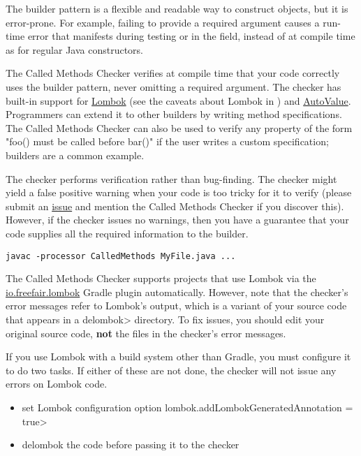 \htmlhr
{}

The builder pattern is a flexible and readable way to construct objects, but it is error-prone.
For example, failing to provide a required argument causes a run-time error that manifests during testing
or in the field, instead of at compile time as for regular Java constructors.

The Called Methods Checker verifies at compile time that your code correctly uses the builder pattern,
never omitting a required argument. The checker has built-in support for \href{https://projectlombok.org/}{Lombok}
(see the caveats about Lombok in ) and
\href{https://github.com/google/auto/blob/master/value/userguide/index.md}{AutoValue}.
Programmers can extend it to other builders by writing method specifications.
The Called Methods Checker can also be used to verify any property of the form "foo() must be called
before bar()" if the user writes a custom specification; builders are a common example.

The checker performs verification rather than bug-finding.  The checker
might yield a false positive warning when your code is too tricky for it to
verify (please submit an
\href{https://github.com/typetools/checker-framework/issues}{issue} and mention the Called Methods Checker if
you discover this).  However, if the checker issues no warnings, then you
have a guarantee that your code supplies all the required information to
the builder.


\begin{Verbatim}
javac -processor CalledMethods MyFile.java ...
\end{Verbatim}


The Called Methods Checker supports projects that use Lombok via
the \href{https://plugins.gradle.org/plugin/io.freefair.lombok}{io.freefair.lombok} Gradle plugin automatically.
However, note that the checker's error messages refer to Lombok's output, which is a variant of your source code
that appears in a \<delombok> directory.
To fix issues, you should edit your original source code, \textbf{not} the files in the checker's error messages.

If you use Lombok with a build system other than Gradle, you must configure it to do two tasks.
If either of these are not done, the checker will not issue any errors on Lombok code.
\begin{itemize}
\item set Lombok configuration option \<lombok.addLombokGeneratedAnnotation = true>
\item delombok the code before passing it to the checker
\end{itemize}

